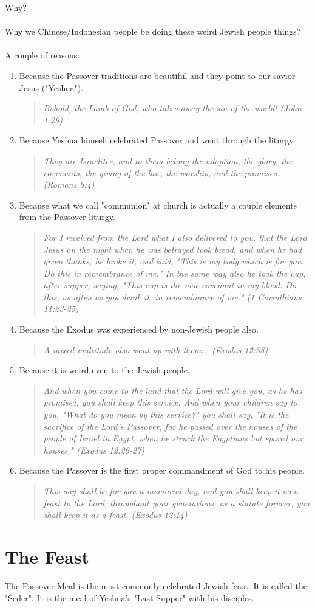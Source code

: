 \documentclass[10pt,oneside,footinclude=true,headinclude=true]{scrbook} %
\newcommand\quot[1]{
	\begin{quote}\textit{\small#1}\end{quote}
}
\begin{document}
Why?\\
\\
Why we Chinese/Indonesian people be doing these weird Jewish people things?\\
\\
A couple of reasons:
\begin{enumerate}
	\item{
		Because the Passover traditions are beautiful and they point to our savior Jesus ("Yeshua").
		\quot{Behold, the Lamb of God, who takes away the sin of the world! (John 1:29)}
	}
	\item{
		Because Yeshua himself celebrated Passover and went through the liturgy.
		\quot{They are Israelites, and to them belong the adoption, the glory, the covenants, the giving of the law, the worship, and the promises. (Romans 9:4)}
	}
	\item{
		Because what we call "communion" at church is actually a couple elements from the Passover liturgy.
		\quot{For I received from the Lord what I also delivered to you, that the Lord Jesus on the night when he was betrayed took bread, and when he had given thanks, he broke it, and said, "This is my body which is for you. Do this in remembrance of me." In the same way also he took the cup, after supper, saying, "This cup is the new covenant in my blood. Do this, as often as you drink it, in remembrance of me." (1 Corinthians 11:23-25)}
	}
	\item{
		Because the Exodus was experienced by non-Jewish people also.
		\quot{A mixed multitude also went up with them... (Exodus 12:38)}
	}
	\item{
		Because it is weird even to the Jewish people.
		\quot{And when you come to the land that the Lord will give you, as he has promised, you shall keep this service. And when your children say to you, "What do you mean by this service?" you shall say, "It is the sacrifice of the Lord's Passover, for he passed over the houses of the people of Israel in Egypt, when he struck the Egyptians but spared our houses." (Exodus 12:26-27)}
	}
	\item{
		Because the Passover is the first proper commandment of God to his people.
		\quot{This day shall be for you a memorial day, and you shall keep it as a feast to the Lord; throughout your generations, as a statute forever, you shall keep it as a feast. (Exodus 12:14)}
	}
\end{enumerate}


\section{The Feast}
The Passover Meal is the most commonly celebrated Jewish feast. It is called the "Seder". It is the meal of Yeshua's "Last Supper" with his disciples.
\end{document}
